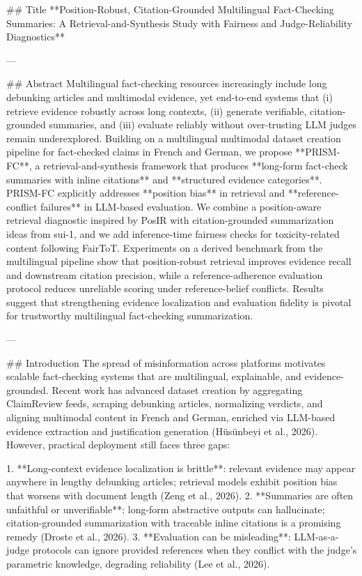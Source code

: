 ## Title  
**Position-Robust, Citation-Grounded Multilingual Fact-Checking Summaries: A Retrieval-and-Synthesis Study with Fairness and Judge-Reliability Diagnostics**

---

## Abstract  
Multilingual fact-checking resources increasingly include long debunking articles and multimodal evidence, yet end-to-end systems that (i) retrieve evidence robustly across long contexts, (ii) generate verifiable, citation-grounded summaries, and (iii) evaluate reliably without over-trusting LLM judges remain underexplored. Building on a multilingual multimodal dataset creation pipeline for fact-checked claims in French and German, we propose **PRISM-FC**, a retrieval-and-synthesis framework that produces **long-form fact-check summaries with inline citations** and **structured evidence categories**. PRISM-FC explicitly addresses **position bias** in retrieval and **reference-conflict failures** in LLM-based evaluation. We combine a position-aware retrieval diagnostic inspired by PosIR with citation-grounded summarization ideas from sui-1, and we add inference-time fairness checks for toxicity-related content following FairToT. Experiments on a derived benchmark from the multilingual pipeline show that position-robust retrieval improves evidence recall and downstream citation precision, while a reference-adherence evaluation protocol reduces unreliable scoring under reference-belief conflicts. Results suggest that strengthening evidence localization and evaluation fidelity is pivotal for trustworthy multilingual fact-checking summarization.

---

## Introduction  
The spread of misinformation across platforms motivates scalable fact-checking systems that are multilingual, explainable, and evidence-grounded. Recent work has advanced dataset creation by aggregating ClaimReview feeds, scraping debunking articles, normalizing verdicts, and aligning multimodal content in French and German, enriched via LLM-based evidence extraction and justification generation (Hüsünbeyi et al., 2026). However, practical deployment still faces three gaps:

1. **Long-context evidence localization is brittle**: relevant evidence may appear anywhere in lengthy debunking articles; retrieval models exhibit position bias that worsens with document length (Zeng et al., 2026).  
2. **Summaries are often unfaithful or unverifiable**: long-form abstractive outputs can hallucinate; citation-grounded summarization with traceable inline citations is a promising remedy (Droste et al., 2026).  
3. **Evaluation can be misleading**: LLM-as-a-judge protocols can ignore provided references when they conflict with the judge’s parametric knowledge, degrading reliability (Lee et al., 2026).  

